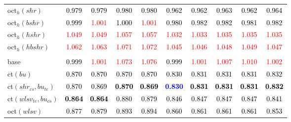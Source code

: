 \begin{tabular}[t]{>{\centering\arraybackslash}m{2.5cm}ccccccccc}
oct$_h(shr)$ & \textcolor{black}{0.979} & \textcolor{black}{0.979} & \textcolor{black}{0.980} & \textcolor{black}{0.980} & \textcolor{black}{0.962} & \textcolor{black}{0.962} & \textcolor{black}{0.963} & \textcolor{black}{0.962} & \textcolor{black}{0.964}\\
oct$_h(bshr)$ & \textcolor{black}{0.999} & \textcolor{red}{1.001} & \textcolor{black}{1.000} & \textcolor{red}{1.001} & \textcolor{black}{0.980} & \textcolor{black}{0.982} & \textcolor{black}{0.982} & \textcolor{black}{0.981} & \textcolor{black}{0.982}\\
oct$_h(hshr)$ & \textcolor{red}{1.049} & \textcolor{red}{1.049} & \textcolor{red}{1.057} & \textcolor{red}{1.057} & \textcolor{red}{1.032} & \textcolor{red}{1.033} & \textcolor{red}{1.035} & \textcolor{red}{1.035} & \textcolor{red}{1.035}\\
oct$_h(hbshr)$ & \textcolor{red}{1.062} & \textcolor{red}{1.063} & \textcolor{red}{1.071} & \textcolor{red}{1.072} & \textcolor{red}{1.045} & \textcolor{red}{1.046} & \textcolor{red}{1.048} & \textcolor{red}{1.049} & \textcolor{red}{1.047}\\
\addlinespace[0.3em]
\multicolumn{10}{c}{\textbf{$k = 2$}}\\
base & \textcolor{black}{0.999} & \textcolor{red}{1.001} & \textcolor{red}{1.073} & \textcolor{red}{1.076} & \textcolor{black}{0.999} & \textcolor{red}{1.001} & \textcolor{red}{1.007} & \textcolor{red}{1.010} & \textcolor{red}{1.002}\\
ct$(bu)$ & \textcolor{black}{0.870} & \textcolor{black}{0.870} & \textcolor{black}{0.870} & \textcolor{black}{0.870} & \textcolor{black}{0.830} & \textcolor{black}{0.831} & \textcolor{black}{0.831} & \textcolor{black}{0.831} & \textcolor{black}{0.832}\\
ct$(shr_{cs}, bu_{te})$ & \textcolor{black}{0.870} & \textcolor{black}{0.869} & \textcolor{black}{\textbf{0.870}} & \textcolor{black}{\textbf{0.869}} & \textcolor{blue}{\textbf{0.830}} & \textcolor{black}{\textbf{0.831}} & \textcolor{black}{\textbf{0.831}} & \textcolor{black}{\textbf{0.831}} & \textcolor{black}{\textbf{0.832}}\\
ct$(wlsv_{te}, bu_{cs})$ & \textcolor{black}{\textbf{0.864}} & \textcolor{black}{\textbf{0.864}} & \textcolor{black}{0.880} & \textcolor{black}{0.879} & \textcolor{black}{0.846} & \textcolor{black}{0.847} & \textcolor{black}{0.847} & \textcolor{black}{0.847} & \textcolor{black}{0.841}\\
oct$(wlsv)$ & \textcolor{black}{0.877} & \textcolor{black}{0.879} & \textcolor{black}{0.893} & \textcolor{black}{0.894} & \textcolor{black}{0.860} & \textcolor{black}{0.861} & \textcolor{black}{0.861} & \textcolor{black}{0.861} & \textcolor{black}{0.853}\\

\end{tabular}
